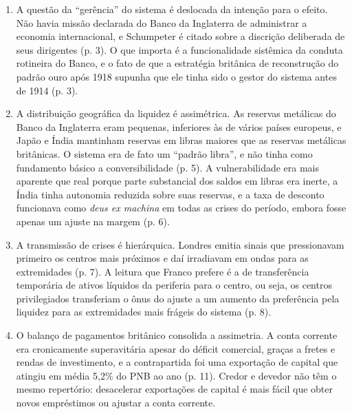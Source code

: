 \begin{enumerate}[leftmargin=*,nosep]
\item A questão da ``gerência'' do sistema é deslocada da intenção para o
efeito. Não havia missão declarada do Banco da Inglaterra de administrar a
economia internacional, e Schumpeter é citado sobre a discrição deliberada de
seus dirigentes (p. 3). O que importa é a funcionalidade sistêmica da conduta
rotineira do Banco, e o fato de que a estratégia britânica de reconstrução do
padrão ouro após 1918 supunha que ele tinha sido o gestor do sistema antes de
1914 (p. 3).

\item A distribuição geográfica da liquidez é assimétrica. As reservas
metálicas do Banco da Inglaterra eram pequenas, inferiores às de vários países
europeus, e Japão e Índia mantinham reservas em libras maiores que as reservas
metálicas britânicas. O sistema era de fato um ``padrão libra'', e não tinha
como fundamento básico a conversibilidade (p. 5). A vulnerabilidade era mais
aparente que real porque parte substancial dos saldos em libras era inerte, a
Índia tinha autonomia reduzida sobre suas reservas, e a taxa de desconto
funcionava como \textit{deus ex machina} em todas as crises do período, embora
fosse apenas um ajuste na margem (p. 6).

\item A transmissão de crises é hierárquica. Londres emitia sinais que
pressionavam primeiro os centros mais próximos e daí irradiavam em ondas para
as extremidades (p. 7). A leitura que Franco prefere é a de transferência
temporária de ativos líquidos da periferia para o centro, ou seja, os centros
privilegiados transferiam o ônus do ajuste a um aumento da preferência pela
liquidez para as extremidades mais frágeis do sistema (p. 8).

\item O balanço de pagamentos britânico consolida a assimetria. A conta
corrente era cronicamente superavitária apesar do déficit comercial, graças a
fretes e rendas de investimento, e a contrapartida foi uma exportação de
capital que atingiu em média 5,2\% do PNB ao ano (p. 11). Credor e devedor não
têm o mesmo repertório: desacelerar exportações de capital é mais fácil que
obter novos empréstimos ou ajustar a conta corrente.



\end{enumerate}
